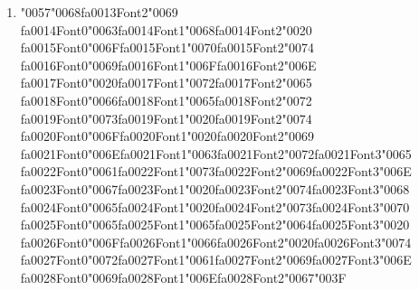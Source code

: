 \documentclass[12pt]{article}
\begin{document}
\begin{enumerate}[label=Q\arabic*.]
\begin{enumerate}[label=(\Alph*)]
    \item To store the final output of the entire sequence.
    \item To act as a memory that carries information from previous time steps
    \item To calculate the loss function for the current word
    \item To normalize the input embeddings
\end{enumerate}
\item {\char"0057}{\char"0068}{\csname fa0013Font2\endcsname\char"0069} {\csname fa0014Font0\endcsname\char"0063}{\csname fa0014Font1\endcsname\char"0068}{\csname fa0014Font2\endcsname\char"0020} {\csname fa0015Font0\endcsname\char"006F}{\csname fa0015Font1\endcsname\char"0070}{\csname fa0015Font2\endcsname\char"0074} {\csname fa0016Font0\endcsname\char"0069}{\csname fa0016Font1\endcsname\char"006F}{\csname fa0016Font2\endcsname\char"006E} {\csname fa0017Font0\endcsname\char"0020}{\csname fa0017Font1\endcsname\char"0072}{\csname fa0017Font2\endcsname\char"0065} {\csname fa0018Font0\endcsname\char"0066}{\csname fa0018Font1\endcsname\char"0065}{\csname fa0018Font2\endcsname\char"0072} {\csname fa0019Font0\endcsname\char"0073}{\csname fa0019Font1\endcsname\char"0020}{\csname fa0019Font2\endcsname\char"0074} {\csname fa0020Font0\endcsname\char"006F}{\csname fa0020Font1\endcsname\char"0020}{\csname fa0020Font2\endcsname\char"0069} {\csname fa0021Font0\endcsname\char"006E}{\csname fa0021Font1\endcsname\char"0063}{\csname fa0021Font2\endcsname\char"0072}{\csname fa0021Font3\endcsname\char"0065} {\csname fa0022Font0\endcsname\char"0061}{\csname fa0022Font1\endcsname\char"0073}{\csname fa0022Font2\endcsname\char"0069}{\csname fa0022Font3\endcsname\char"006E} {\csname fa0023Font0\endcsname\char"0067}{\csname fa0023Font1\endcsname\char"0020}{\csname fa0023Font2\endcsname\char"0074}{\csname fa0023Font3\endcsname\char"0068} {\csname fa0024Font0\endcsname\char"0065}{\csname fa0024Font1\endcsname\char"0020}{\csname fa0024Font2\endcsname\char"0073}{\csname fa0024Font3\endcsname\char"0070} {\csname fa0025Font0\endcsname\char"0065}{\csname fa0025Font1\endcsname\char"0065}{\csname fa0025Font2\endcsname\char"0064}{\csname fa0025Font3\endcsname\char"0020} {\csname fa0026Font0\endcsname\char"006F}{\csname fa0026Font1\endcsname\char"0066}{\csname fa0026Font2\endcsname\char"0020}{\csname fa0026Font3\endcsname\char"0074} {\csname fa0027Font0\endcsname\char"0072}{\csname fa0027Font1\endcsname\char"0061}{\csname fa0027Font2\endcsname\char"0069}{\csname fa0027Font3\endcsname\char"006E} {\csname fa0028Font0\endcsname\char"0069}{\csname fa0028Font1\endcsname\char"006E}{\csname fa0028Font2\endcsname\char"0067}{\char"003F}

\end{enumerate}
\end{document}
